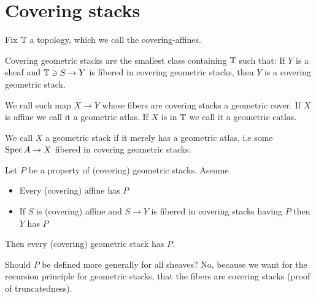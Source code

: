 
\section{Covering stacks}
Fix $\mathbb{T}$ a topology, which we call the covering-affines.
\begin{definition}
	Covering geometric stacks are the smallest class containing $\mathbb{T}$ such that: If $Y$ is a sheaf and $\mathbb{T} \ni S \to Y$ is fibered in covering geometric stacks, then $Y$ is a covering geometric stack.	
\end{definition}
We call such map $X \to Y$ whose fibers are covering stacks a geometric cover. If $X$ is affine we call it a geometric atlas. If $X$ is in $\mathbb{T}$ we call it a geometric catlas. 
\begin{definition}
	We call $X$ a geometric stack if it merely has a geometric atlas, i.e some $\operatorname{Spec} A \to X$ fibered in covering geometric stacks.
\end{definition}
\begin{prop}
	Let $P$ be a property of (covering) geometric stacks. Assume
	\begin{itemize}
		\item Every (covering) affine has $P$
		\item If $S$ is (covering) affine and $S \to Y$ is fibered in covering stacks having $P$ then $Y$ has $P$
	\end{itemize}
	Then every (covering) geometric stack has $P$.
\end{prop}
%	
\begin{why}
	Should $P$ be defined more generally for all sheaves?
	No, because we want for the recursion principle for geometric stacks, that the fibers are covering stacks (proof of truncatedness).
\end{why}


